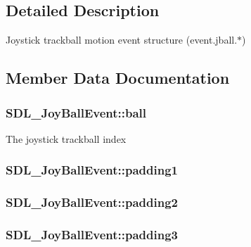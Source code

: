 \subsection{Detailed Description}
Joystick trackball motion event structure (event.\-jball.$\ast$) 

\subsection{Member Data Documentation}
\hypertarget{struct_s_d_l___joy_ball_event_add4eb0daeaf95ae56e8c7cfcec560242}{
\subsubsection[{ball}]{ S\-D\-L\-\_\-\-Joy\-Ball\-Event\-::ball}}\label{struct_s_d_l___joy_ball_event_add4eb0daeaf95ae56e8c7cfcec560242}
The joystick trackball index \hypertarget{struct_s_d_l___joy_ball_event_aff75a6519ca2a19cffdc14ebf4626613}{
\subsubsection[{padding1}]{ S\-D\-L\-\_\-\-Joy\-Ball\-Event\-::padding1}}\label{struct_s_d_l___joy_ball_event_aff75a6519ca2a19cffdc14ebf4626613}
\hypertarget{struct_s_d_l___joy_ball_event_a0ea3071b99ac096b0157714f01ff04f8}{
\subsubsection[{padding2}]{ S\-D\-L\-\_\-\-Joy\-Ball\-Event\-::padding2}}\label{struct_s_d_l___joy_ball_event_a0ea3071b99ac096b0157714f01ff04f8}
\hypertarget{struct_s_d_l___joy_ball_event_acb700712f1a4070bc114ef9d55b00640}{
\subsubsection[{padding3}]{ S\-D\-L\-\_\-\-Joy\-Ball\-Event\-::padding3}}\label{struct_s_d_l___joy_ball_event_acb700712f1a4070bc114ef9d55b00640}
